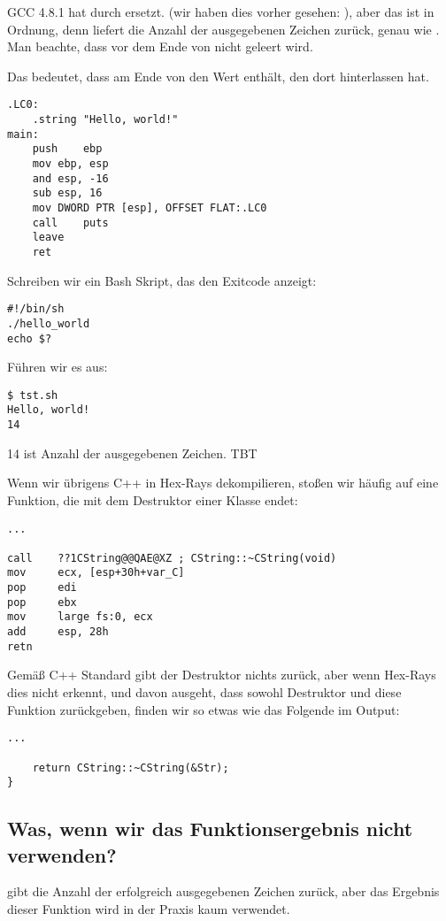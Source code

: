 GCC 4.8.1 hat \printf durch \puts ersetzt. 
(wir haben dies vorher gesehen: ), aber das ist in Ordnung,
denn \puts liefert die Anzahl der ausgegebenen Zeichen zurück, genau wie \printf.
Man beachte, dass \EAX vor dem Ende von \main nicht geleert wird.

Das bedeutet, dass \EAX am Ende von \main den Wert enthält, den \puts dort hinterlassen hat.

\begin{lstlisting}[caption=GCC 4.8.1,style=customasmx86]
.LC0:
	.string	"Hello, world!"
main:
	push	ebp
	mov	ebp, esp
	and	esp, -16
	sub	esp, 16
	mov	DWORD PTR [esp], OFFSET FLAT:.LC0
	call	puts
	leave
	ret
\end{lstlisting}


Schreiben wir ein Bash Skript, das den Exitcode anzeigt:

\begin{lstlisting}[caption=tst.sh]
#!/bin/sh
./hello_world
echo $?
\end{lstlisting}

Führen wir es aus:

\begin{lstlisting}
$ tst.sh 
Hello, world!
14
\end{lstlisting}

14 ist Anzahl der ausgegebenen Zeichen.
\ac{TBT}

Wenn wir übrigens C++ in Hex-Rays dekompilieren, stoßen wir häufig auf eine Funktion, die mit dem Destruktor einer
Klasse endet:

\begin{lstlisting}[style=customasmx86]
...

call    ??1CString@@QAE@XZ ; CString::~CString(void)
mov     ecx, [esp+30h+var_C]
pop     edi
pop     ebx
mov     large fs:0, ecx
add     esp, 28h
retn
\end{lstlisting}
Gemäß C++ Standard gibt der Destruktor nichts zurück, aber wenn Hex-Rays dies nicht erkennt, und davon ausgeht, dass
sowohl Destruktor und diese Funktion \Tint zurückgeben, finden wir so etwas wie das Folgende im Output:

\begin{lstlisting}[style=customc]
...

	return CString::~CString(&Str);
}
\end{lstlisting}

\subsection{Was, wenn wir das Funktionsergebnis nicht verwenden?}
\printf gibt die Anzahl der erfolgreich ausgegebenen Zeichen zurück, aber das Ergebnis dieser Funktion wird in der
Praxis kaum verwendet.

